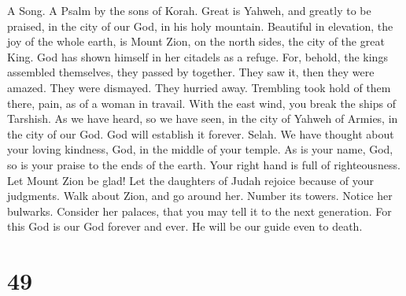 A Song. A Psalm by the sons of Korah.  Great is Yahweh,
and greatly to be praised, in the city of our God, in his holy mountain.
 Beautiful in elevation, the joy of the whole earth, is
Mount Zion, on the north sides, the city of the great King.
 God has shown himself in her citadels as a refuge.
 For, behold, the kings assembled themselves, they passed
by together.  They saw it, then they were amazed. They
were dismayed. They hurried away.  Trembling took hold of
them there, pain, as of a woman in travail.  With the east
wind, you break the ships of Tarshish.  As we have heard,
so we have seen, in the city of Yahweh of Armies, in the city of our
God. God will establish it forever. Selah.  We have
thought about your loving kindness, God, in the middle of your temple.
 As is your name, God, so is your praise to the ends of
the earth. Your right hand is full of righteousness.  Let
Mount Zion be glad! Let the daughters of Judah rejoice because of your
judgments.  Walk about Zion, and go around her. Number
its towers.  Notice her bulwarks. Consider her palaces,
that you may tell it to the next generation.  For this
God is our God forever and ever. He will be our guide even to death.

\hypertarget{section-48}{%
\section{49}\label{section-48}}

